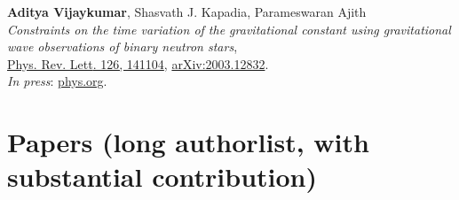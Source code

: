 \begin{etaremune}
	\item 
	\textbf{Aditya Vijaykumar}, Shasvath J. Kapadia, Parameswaran Ajith\\
	\textit{Constraints on the time variation of the gravitational constant using gravitational wave observations of binary neutron stars},\\
	\href{https://journals.aps.org/prl/abstract/10.1103/PhysRevLett.126.141104}{{Phys. Rev. Lett}. 126, 141104}, \href{https://arxiv.org/abs/2003.12832}{arXiv:2003.12832}.\\
	\textit{In press}: \href{https://phys.org/news/2021-05-constraints-variation-gravitational-constant.html}{phys.org}.

\end{etaremune}

\section{Papers (long authorlist, with substantial contribution)}
